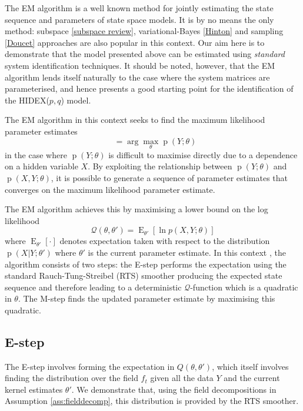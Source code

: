 \documentclass{IEEEtran}
\DeclareMathOperator{\E}{E}
\DeclareMathOperator{\p}{p}
\DeclareMathOperator{\thetaML}{\theta_{\mathrm{ML}}}
\begin{document}
The EM algorithm is a well known method for jointly estimating the state sequence and parameters of state space models. It is by no means the only method: subspace \ref{subspace review}, variational-Bayes \ref{Hinton} and sampling \ref{Doucet} approaches are also popular in this context. Our aim here is to demonstrate that the model presented above can be estimated using \emph{standard} system identification techniques. It should be noted, however, that the EM algorithm lends itself naturally to the case where the system matrices are parameterised, and hence presents a good starting point for the identification of the HIDEX($p,q$) model.

The EM algorithm in this context seeks to find the maximum likelihood parameter estimates 
\begin{equation}
\thetaML=\arg\max_{\theta} \p (Y ; \theta)
\end{equation}
in the case where $\p(Y;\theta)$ is difficult to maximise directly due to a dependence on a hidden variable $X$. By exploiting the relationship between $\p(Y; \theta)$ and $\p(X,Y; \theta)$, it is possible to generate a sequence of parameter estimates that converges on the maximum likelihood parameter estimate.

The EM algorithm achieves this by maximising a lower bound on the log likelihood
\begin{equation}
	\mathcal{Q}(\theta,\theta')=\E_{\theta'}\left[\ln p(X,Y;\theta)\right]
\end{equation}
where $\E_{\theta'}[\cdot]$ denotes expectation taken with respect to the distribution $\p(X|Y ; \theta')$ where $\theta'$ is the current parameter estimate. In this context \cite{Gibson05}, the algorithm consists of two steps: the E-step performs the expectation using the standard Rauch-Tung-Streibel (RTS) smoother \cite{Rauch65} producing the expected state sequence and therefore leading to a deterministic $\mathcal{Q}$-function which is a quadratic in $\theta$. The M-step finds the updated parameter estimate by maximising this quadratic.

\subsection{E-step}

The E-step involves forming the expectation in $Q(\theta,\theta')$, which itself involves finding the distribution over the field $f_t$ given all the data $Y$ and the current kernel estimates $\theta'$. We demonstrate that, using the field decompositions in Assumption \ref{ass:fielddecomp}, this distribution is provided by the RTS smoother. 
\end{document}
